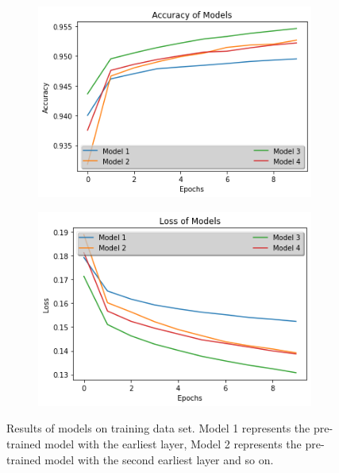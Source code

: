 \documentclass{article}
\begin{document}
\begin{figure}[ht]
    \centering
    \begin{subfigure}[b]{0.8\linewidth}
      \includegraphics[width=\linewidth]{accuracy.png}
    \end{subfigure}
    
    \begin{subfigure}[b]{0.8\linewidth}
      \includegraphics[width=\linewidth]{loss.png}
    \end{subfigure}
    \caption{Results of models on training data set. Model 1 represents the pre-trained model with the earliest layer, Model 2 represents the pre-trained model with the second earliest layer and so on.}
  \end{figure}
\end{document}
